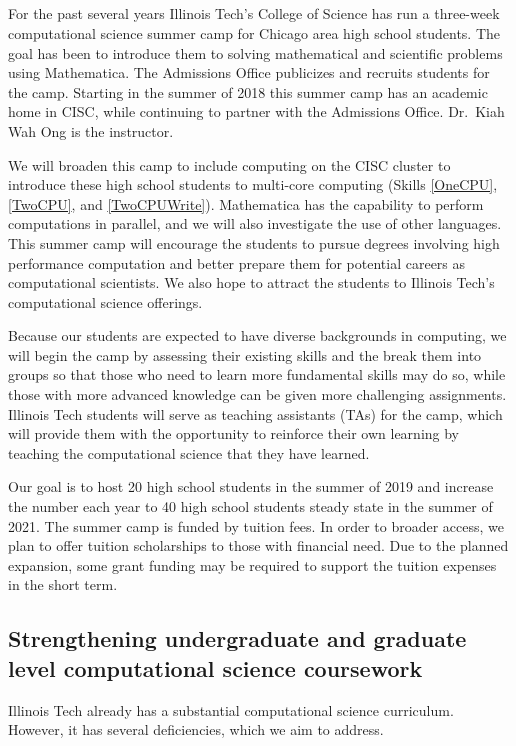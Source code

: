 \documentclass[11pt]{NSFamsart}
\begin{document}
\subsection{\CampName} \label{Camp} For the past several years Illinois Tech's College of Science has run a three-week computational science summer camp for Chicago area high school students.  The goal has been to introduce them to solving mathematical and scientific problems using Mathematica.  The Admissions Office publicizes and recruits students for the camp.  Starting in the summer of 2018 this summer camp has an academic home in CISC, while continuing to partner with the Admissions Office.  Dr.~Kiah Wah Ong is the instructor.

We will broaden this camp to include computing on the CISC cluster to introduce these high school students to multi-core computing (Skills \ref{OneCPU}, \ref{TwoCPU}, and \ref{TwoCPUWrite}).  Mathematica has the capability to perform computations in parallel, and we will also investigate the use of other languages.  This summer camp will encourage the students to pursue degrees involving high performance computation and better prepare them for potential careers as computational scientists.  We also hope to attract the students to Illinois Tech's computational science offerings.  

Because our students are expected to have diverse backgrounds in computing, we will begin the camp by assessing their existing skills and the break them into groups so that those who need to learn more fundamental skills may do so, while those with more advanced knowledge can be given more challenging assignments.  Illinois Tech students will serve as teaching assistants (TAs) for the camp, which will provide them with the opportunity to reinforce their own learning by teaching the computational science that they have learned. 

Our goal is to host 20 high school students in the summer of 2019 and increase the number each year to 40 high school students steady state in the summer of 2021.  The summer camp is funded by tuition fees.  In order to broader access, we plan to offer tuition scholarships to those with financial need.  Due to the planned expansion, some grant funding may be required to support the tuition expenses in the short term.

\subsection{Strengthening undergraduate and graduate level computational science coursework} \label{Curr} 
Illinois Tech already has a substantial computational science curriculum.  However, it has several deficiencies, which we aim to address.
\end{document}

